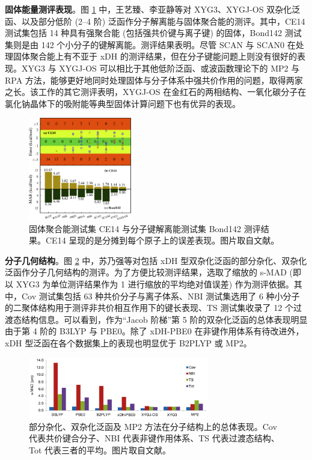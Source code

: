\textbf{固体能量测评表现}。图 \ref{fig.xdh-solid} 中，王艺臻、李亚静等对 XYG3、XYGJ-OS 双杂化泛函、以及部分低阶 (2--4 阶) 泛函作分子解离能与固体聚合能的测评\cite{Wang-Xu.JA.2021}。其中，CE14 测试集包括 14 种具有强聚合能 (包括强共价键与离子键) 的固体，Bond142 测试集则是由 142 个小分子的键解离能。测评结果表明。尽管 SCAN 与 SCAN0 在处理固体聚合能上有不亚于 xDH 的测评结果，但在分子键能问题上则没有很好的表现。XYG3 与 XYGJ-OS 可以相比于其他低阶泛函、或波函数理论下的 MP2 与 RPA 方法，能够更好地同时处理固体与分子体系中强共价作用的问题，取得两家之长。该工作的其它测评表明，XYGJ-OS 在金红石的两相结构、一氧化碳分子在氯化钠晶体下的吸附能等典型固体计算问题下也有优异的表现。

\begin{figure}[h]
  \centering
  \caption{固体聚合能测试集 CE14 与分子键解离能测试集 Bond142 测评结果。CE14 呈现的是分摊到每个原子上的误差表现。图片取自文献\cite{Wang-Xu.JA.2021}。}
  \label{fig.xdh-solid}
  \includegraphics[width=0.4\textwidth]{assets/xdh-solid.jpeg}
\end{figure}

\textbf{分子几何结构}。图 \ref{fig.xdh-pbe0-bond} 中，苏乃强等对包括 xDH 型双杂化泛函的部分杂化、双杂化泛函作分子几何结构的测评\cite{Su-Xu.SCC.2013}。为了方便比较测评结果，选取了缩放的 s-MAD (即以 XYG3 为单位测评结果作为 1 进行缩放的平均绝对值误差) 作为测评依据。其中，Cov 测试集包括 63 种共价分子与离子体系、NBI 测试集选用了 6 种小分子的二聚体结构用于测评非共价相互作用下的键长表现、TS 测试集收录了 12 个过渡态结构信息。可以看到，作为“Jacob 阶梯”第 5 阶的双杂化泛函的总体表现明显由于第 4 阶的 B3LYP 与 PBE0。除了 xDH-PBE0 在非键作用体系有待改进外，xDH 型泛函在各个数据集上的表现也明显优于 B2PLYP 或 MP2。

\begin{figure}[h]
  \centering
  \caption{部分杂化、双杂化泛函及 MP2 方法在分子结构上的总体表现。Cov 代表共价键合分子、NBI 代表非键作用体系、TS 代表过渡态结构、Tot 代表三者的平均。图片取自文献\cite{Su-Xu.SCC.2013}。}
  \label{fig.xdh-pbe0-bond}
  \includegraphics[width=0.7\textwidth]{assets/xdh-pbe0-bond.jpg}
\end{figure}

